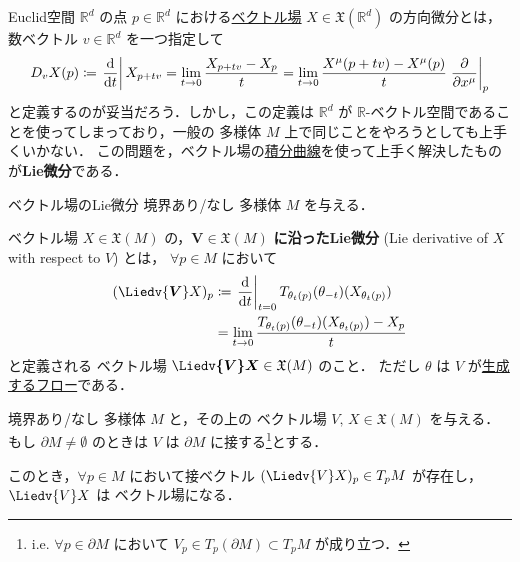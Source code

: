 \documentclass[TQFT_main]{subfiles}
\begin{document}
Euclid空間 $\mathbb{R}^d$ の点 $p \in \mathbb{R}^d$ における\hyperref[def:vecf]{ベクトル場} $X \in \mathfrak{X}(\mathbb{R}^d)$ の方向微分とは，数ベクトル $v \in \mathbb{R}^d$ を一つ指定して
\begin{align}
    D_v X (p) \coloneqq \eval{\dv{}{t}} X_{p + tv} = \lim_{t \to 0} \frac{X_{p+tv} - X_p}{t} = \lim_{t\to 0} \frac{X^\mu (p+tv) - X^\mu (p)}{t} \eval{\pdv{}{x^\mu}}_p \label{eq:direction}
\end{align}
と定義するのが妥当だろう．しかし，この定義は $\mathbb{R}^d$ が $\mathbb{R}$-ベクトル空間であることを使ってしまっており，一般の \cinfty 多様体 $M$ 上で同じことをやろうとしても上手くいかない．
この問題を，ベクトル場の\hyperref[def:integral-curve]{積分曲線}を使って上手く解決したものが\textbf{Lie微分}である．

\begin{mydef}[label=def:Liedv]{ベクトル場のLie微分}
    境界あり/なし \cinfty 多様体 $M$ を与える．

    ベクトル場 $X \in \mathfrak{X}(M)$ の，$\bm{V} \in \mathfrak{X}(M)$ \textbf{に沿ったLie微分} (Lie derivative of $X$ with respect to $V$) とは，
    $\forall p \in M$ において
    \begin{align}
        (\Liedv{\bm{V}} X)_p &\coloneqq \eval{\dv{}{t}}_{t=0} T_{\theta_t (p)}(\theta_{-t})(X_{\theta_t(p)}) \\
        &= \lim_{t\to 0} \frac{T_{\theta_t(p)} (\theta_{-t}) (X_{\theta_t (p)}) - X_p}{t}
    \end{align}
    と定義される \cinfty ベクトル場 $\bm{\Liedv{V} X} \in \mathfrak{X}(M)$ のこと．
    ただし $\theta$ は $V$ が\hyperref[thm:fundamental-flow]{生成するフロー}である．
\end{mydef}

\begin{myprop}[label=prop:Liedv-smooth]{}
    境界あり/なし \cinfty 多様体 $M$ と，その上の \cinfty ベクトル場 $V,\, X \in \mathfrak{X}(M)$ を与える．
    もし $\partial M \neq \emptyset$ のときは $V$ は $\partial M$ に接する\footnote{i.e. $\forall p \in \partial M$ において $V_p \in T_p (\partial M) \subset T_p M$ が成り立つ．}とする．

    このとき，$\forall p \in M$ において接ベクトル $(\Liedv{V} X)_p \in T_p M$ が存在し，$\Liedv{V}X$ は \cinfty ベクトル場になる．
\end{myprop}
\end{document}
